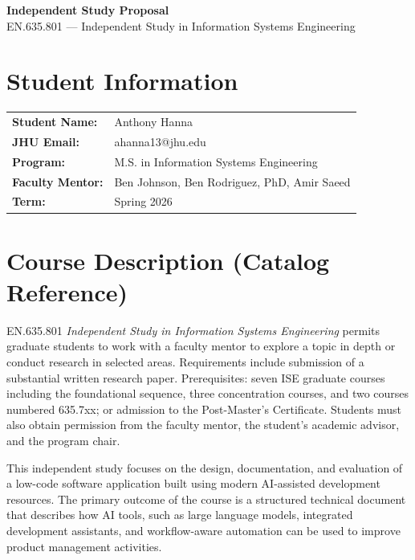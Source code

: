\documentclass[11pt]{article}
\begin{document}
\begin{center}
    {\Large \textbf{Independent Study Proposal}}\\[6pt]
    {\large EN.635.801 --- Independent Study in Information Systems Engineering}\\[12pt]
\end{center}

\section*{Student Information}

\begin{tabular}{ll}
\textbf{Student Name:} & Anthony Hanna \\
\textbf{JHU Email:} & ahanna13@jhu.edu \\
\textbf{Program:} & M.S. in Information Systems Engineering \\
\textbf{Faculty Mentor:} & Ben Johnson, Ben Rodriguez, PhD, Amir Saeed \\
\textbf{Term:} & Spring 2026 \\
\end{tabular}

\section*{Course Description (Catalog Reference)}

\noindent
EN.635.801 \textit{Independent Study in Information Systems Engineering} permits graduate students to work with a faculty mentor to explore a topic in depth or conduct research in selected areas. Requirements include submission of a substantial written research paper. Prerequisites: seven ISE graduate courses including the foundational sequence, three concentration courses, and two courses numbered 635.7xx; or admission to the Post-Master’s Certificate. Students must also obtain permission from the faculty mentor, the student's academic advisor, and the program chair.

This independent study focuses on the design, documentation, and evaluation of a low-code software application built using modern AI-assisted development resources. The primary outcome of the course is a structured technical document that describes how AI tools, such as large language models, integrated development assistants, and workflow-aware automation can be used to improve product management activities.
\end{document}
